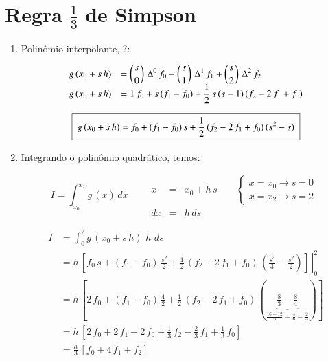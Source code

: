 \section{Regra $\frac{1}{3}$ de Simpson}

\begin{enumerate}
 \item Polinômio interpolante, ?:

\[
 \begin{array}{ll}
  g\,(x_0 + s\,h) & = \displaystyle \left(s \atop 0\right) \, \Delta^0 \, f_0 + \left(s \atop 1\right) \, \Delta^1 \, f_1 + \left(s \atop 2\right) \, \Delta^2 \, f_2 \\
  g\,(x_0 + s\,h) & = 1 \, f_0 + s\,(f_1 - f_0) + \displaystyle \frac{1}{2} \, s \, (s - 1) \, (f_2 - 2\,f_1 + f_0)
 \end{array}
\]

\[
 \quadricular{ g\,(x_0 + s\,h) = f_0 + (f_1 - f_0)\,s + \displaystyle \frac{1}{2} \, (f_2 - 2\,f_1 + f_0) \, (s^2 - s) }
\]

\item Integrando o polinômio quadrático, temos:

\[
 I = \int_{x_0}^{x_2} g\,(x) \, dx
 \qquad
 \begin{array}{rcl}
  x & = & x_0 + h\,s \qquad 
  \left\{
  \begin{array}{l}
   x = x_0 \rightarrow s = 0 \\
   x = x_2 \rightarrow s = 2
  \end{array}
  \right.
  \\
  dx & = & h\,ds
 \end{array}
\]

\[
 \begin{array}{ll}
  I & = \displaystyle \int_0^2 g\,(x_0 + s\,h) \, \, h \, \, ds \\
    & = \left. h \, \left[ f_0\,s + (f_1 - f_0) \, \displaystyle \frac{s^2}{2} + \frac{1}{2} \, (f_2 - 2\,f_1 + f_0)\,\left(\frac{s^3}{3} - \frac{s^2}{2}\right) \right] \, \right|_0^2 \\
    & = h \, \left[ 2\,f_0 + (f_1 - f_0) \, \displaystyle \frac{4}{2} + \frac{1}{2} \, (f_2 - 2\,f_1 + f_0) \, \left( \underbrace{\frac{8}{3} - \frac{8}{4}}_{\frac{16 - 12}{6} = \frac{4}{6} = \frac{2}{3}} \right) \right] \\
    & = h \, \left[ 2\,f_0 + 2\,f_1 - 2\,f_0 + \displaystyle \frac{1}{3}\,f_2 - \frac{2}{3}\,f_1 + \frac{1}{3}\,f_0 \right] \\
    & = \displaystyle \frac{h}{3} \, \left[ f_0 + 4\,f_1 + f_2 \right]
 \end{array}
\]


\end{enumerate}

